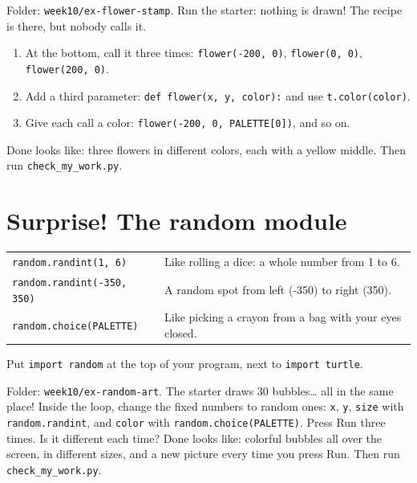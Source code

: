 \begin{exercise}
Folder: \texttt{week10/ex-flower-stamp}. Run the starter: nothing is drawn! The recipe is there, but nobody calls it.
\begin{enumerate}[leftmargin=1.4em,itemsep=1pt]
  \item At the bottom, call it three times: \texttt{flower(-200, 0)}, \texttt{flower(0, 0)}, \texttt{flower(200, 0)}.
  \item Add a third parameter: \texttt{def flower(x, y, color):} and use \texttt{t.color(color)}.
  \item Give each call a color: \texttt{flower(-200, 0, PALETTE[0])}, and so on.
\end{enumerate}
Done looks like: three flowers in different colors, each with a yellow middle. Then run \texttt{check\_my\_work.py}.
\end{exercise}

\section{Surprise! The random module}
\begin{center}
\renewcommand{\arraystretch}{1.5}
\begin{tabularx}{\linewidth}{@{}p{6.9cm}>{\raggedright\arraybackslash}X@{}}
\toprule
\texttt{random.randint(1, 6)} & Like rolling a dice: a whole number from 1 to 6.\\
\texttt{random.randint(-350, 350)} & A random spot from left (-350) to right (350).\\
\texttt{random.choice(PALETTE)} & Like picking a crayon from a bag with your eyes closed.\\
\bottomrule
\end{tabularx}
\end{center}
Put \texttt{import random} at the top of your program, next to \texttt{import turtle}.

\begin{exercise}
Folder: \texttt{week10/ex-random-art}. The starter draws 30 bubbles\ldots{} all in the same place! Inside the loop, change the fixed numbers to random ones: \texttt{x}, \texttt{y}, \texttt{size} with \texttt{random.randint}, and \texttt{color} with \texttt{random.choice(PALETTE)}. Press Run three times. Is it different each time?
Done looks like: colorful bubbles all over the screen, in different sizes, and a new picture every time you press Run. Then run \texttt{check\_my\_work.py}.
\end{exercise}

